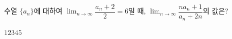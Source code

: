 수열 $\{a_n\}$에 대하여 $\displaystyle\lim_{n\to\infty}\dfrac{a_n+2}{2}=6$일 때, $\displaystyle\lim_{n\to\infty}\dfrac{na_n+1}{a_n+2n}$의 값은?
\begin{choices32}{$1$}{$2$}{$3$}{$4$}{$5$}\end{choices32}
